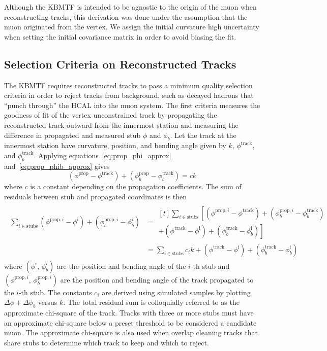 Although the KBMTF is intended to be agnostic to the origin of the muon when reconstructing tracks, this derivation was done under the assumption that the muon originated from the vertex. We assign the initial curvature high uncertainty when setting the initial covariance matrix in order to avoid biasing the fit.

\subsection{Selection Criteria on Reconstructed Tracks} \label{sec:kmtf_qual}
The KBMTF requires reconstructed tracks to pass a minimum quality selection criteria in order to reject tracks from background, such as decayed hadrons that ``punch through'' the HCAL into the muon system. The first criteria measures the goodness of fit of the vertex unconstrained track by propagating the reconstructed track outward from the innermost station and measuring the difference in propagated and measured stub $\phi$ and $\phi_b$. Let the track at the innermost station have curvature, position, and bending angle given by $k$, $\phi^\text{track}$, and $\phi_b^\text{track}$. Applying equations~\ref{eq:prop_phi_approx} and~\ref{eq:prop_phib_approx} gives
\begin{equation}
	\label{eq:residual_prop}
	\left(\phi^\text{prop}-\phi^\text{track}\right)+\left(\phi_b^\text{prop}-\phi_b^\text{track}\right)=ck
\end{equation}
where $c$ is a constant depending on the propagation coefficients. The sum of residuals between stub and propagated coordinates is then 
\begin{align}
	\begin{split}
	\sum_{i\in\text{stubs}}\left(\phi^{\text{prop},i}-\phi^\text{i}\right)+\left(\phi_b^{\text{prop},i}-\phi_b^\text{i}\right)	&=\begin{multlined}[t]
									\sum_{i\in\text{stubs}}\left[(\phi^{\text{prop},i}-\phi^\text{track})+(\phi_b^{\text{prop},i}-\phi_b^\text{track})\right.\\
									+\left.(\phi^\text{track}-\phi^\text{i})+(\phi_b^\text{track}-\phi_b^\text{i})\right]
								\end{multlined}\\
 								& =\sum_{i\in\text{stubs}}c_ik+\left(\phi^\text{track}-\phi^\text{i}\right)+\left(\phi_b^\text{track}-\phi_b^\text{i}\right)
 	\end{split}
\end{align}
where $(\phi^i,\,\phi_b^i)$ are the position and bending angle of the $i$-th stub and $(\phi^{\text{prop},i},\,\phi_b^{\text{prop},i})$ are the position and bending angle of the track propagated to the $i$-th stub. The constants $c_i$ are derived using simulated samples by plotting $\Delta\phi+\Delta\phi_b$ versus $k$. The total residual sum is colloquially referred to as the approximate chi-square of the track. Tracks with three or more stubs must have an approximate chi-square below a preset threshold to be considered a candidate muon. The approximate chi-square is also used when overlap cleaning tracks that share stubs to determine which track to keep and which to reject.

